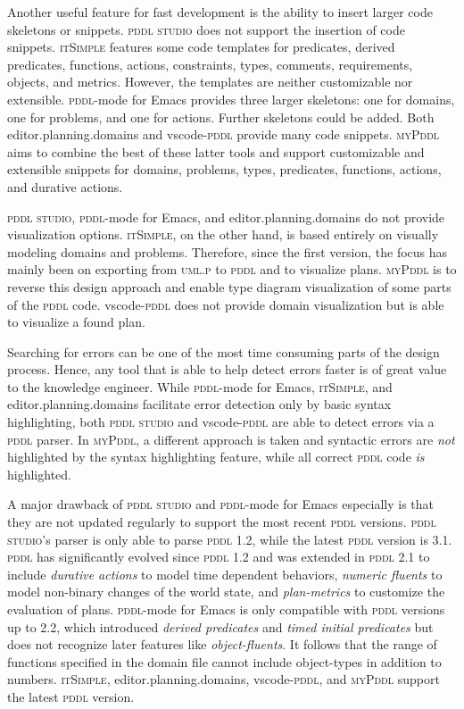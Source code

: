 \documentclass[runningheads]{llncs}
\newcommand{\mypddl}{\textsc{myPddl}\xspace}
\newcommand{\pddlstudio}{\textsc{pddl studio}\xspace}
\newcommand{\epd}{editor.planning.domains\xspace}
\newcommand{\itsimple}{\textsc{itSimple}\xspace}
\newcommand{\pddlmode}{\textsc{pddl}-mode\xspace}
\newcommand{\vscode}{vscode-\textsc{pddl}\xspace}
\newcommand{\pddl}{\textsc{pddl}\xspace}
\begin{document}
Another useful feature for fast development is the ability to insert
larger code skeletons or snippets. \pddlstudio does not support the
insertion of code snippets. \itsimple features some code templates for
predicates, derived predicates, functions, actions, constraints,
types, comments, requirements, objects, and metrics. However, the
templates are neither customizable nor extensible. \pddlmode for Emacs
provides three larger skeletons: one for domains, one for problems,
and one for actions. Further skeletons could be added. Both \epd and
\vscode provide many code snippets. \mypddl aims to combine the best
of these latter tools and support customizable and extensible snippets
for domains, problems, types, predicates, functions, actions, and
durative actions.

\pddlstudio, \pddlmode for Emacs, and \epd do not provide
visualization options. \itsimple, on the other hand, is based entirely
on visually modeling domains and problems. Therefore, since the first
version, the focus has mainly been on exporting from \textsc{uml.p} to
\pddl and to visualize plans. \mypddl is to reverse this design
approach and enable type diagram visualization of some parts of the
\pddl code. \vscode does not provide domain visualization but is able
to visualize a found plan.

Searching for errors can be one of the most time consuming parts of
the design process. Hence, any tool that is able to help detect errors
faster is of great value to the knowledge engineer. While \pddlmode
for Emacs, \itsimple, and \epd facilitate error detection only by
basic syntax highlighting, both \pddlstudio and \vscode are able to
detect errors via a \pddl parser. In \mypddl, a different approach is
taken and syntactic errors are \emph{not} highlighted by the syntax
highlighting feature, while all correct \pddl code \emph{is}
highlighted.

A major drawback of \pddlstudio and \pddlmode for Emacs especially is
that they are not updated regularly to support the most recent \pddl
versions. \pddlstudio's parser is only able to parse \pddl 1.2, while
the latest \pddl version is 3.1. \pddl has significantly evolved since
\pddl 1.2 and was extended in \pddl 2.1 to include \emph{durative
  actions} to model time dependent behaviors, \emph{numeric fluents}
to model non-binary changes of the world state, and
\emph{plan-metrics} to customize the evaluation of plans. \pddlmode
for Emacs is only compatible with \pddl versions up to 2.2, which
introduced \emph{derived predicates} and \emph{timed initial
  predicates} but does not recognize later features like
\emph{object-fluents}. It follows that the range of functions
specified in the domain file cannot include object-types in addition
to numbers. \itsimple, \epd, \vscode, and \mypddl support the latest
\pddl version.
\end{document}
